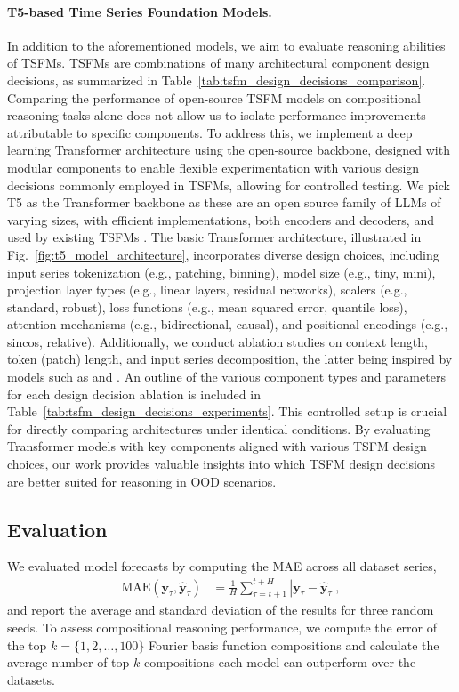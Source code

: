 \paragraph{T5-based Time Series Foundation Models.} In addition to the aforementioned models, we aim to evaluate reasoning abilities of TSFMs. TSFMs are combinations of many architectural component design decisions, as summarized in Table~\ref{tab:tsfm_design_decisions_comparison}. Comparing the performance of open-source TSFM models on compositional reasoning tasks alone does not allow us to isolate performance improvements attributable to specific components. To address this, we implement a deep learning Transformer architecture using the open-source \Tfive backbone, designed with modular components to enable flexible experimentation with various design decisions commonly employed in TSFMs, allowing for controlled testing. We pick T5 as the Transformer backbone as these are an open source family of LLMs of varying sizes, with efficient implementations, both encoders and decoders, and used by existing TSFMs \citep{infinichannelmixer, goswami2024moment}. The basic Transformer architecture, illustrated in Fig.~\ref{fig:t5_model_architecture}, incorporates diverse design choices, including input series tokenization (e.g., patching, binning), model size (e.g., tiny, mini), projection layer types (e.g., linear layers, residual networks), scalers (e.g., standard, robust), loss functions (e.g., mean squared error, quantile loss), attention mechanisms (e.g., bidirectional, causal), and positional encodings (e.g., sincos, relative). Additionally, we conduct ablation studies on context length, token (patch) length, and input series decomposition, the latter being inspired by models such as \DLinear and \Autoformer. An outline of the various component types and parameters for each design decision ablation is included in Table~\ref{tab:tsfm_design_decisions_experiments}. This controlled setup is crucial for directly comparing architectures under identical conditions. By evaluating Transformer models with key components aligned with various TSFM design choices, our work provides valuable insights into which TSFM design decisions are better suited for reasoning in OOD scenarios. 

\subsection{Evaluation}\label{section:evaluation}
We evaluated model forecasts by computing the MAE across all dataset series, 
\begin{align}
    \mathrm{MAE}(\textbf{y}_{\tau}, \hat{\textbf{y}}_{\tau}) &= \frac{1}{H}\sum_{{\tau}=t+1}^{t+H}|\textbf{y}_{\tau} - \hat{\textbf{y}}_{\tau}|,
\end{align}
and report the average and standard deviation of the results for three random seeds. To assess compositional reasoning performance, we compute the error of the top $k=\{1, 2, \hdots, 100\}$ Fourier basis function compositions and calculate the average number of top $k$ compositions each model can outperform over the datasets. 

